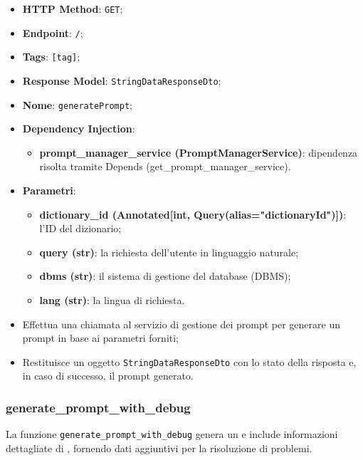 \begin{itemize}
  \item \textbf{HTTP Method}: \texttt{GET};
  \item \textbf{Endpoint}: \texttt{/};
  \item \textbf{Tags}: \texttt{[tag]};
  \item \textbf{Response Model}: \texttt{StringDataResponseDto};
  \item \textbf{Nome}: \texttt{generatePrompt};
  \item \textbf{Dependency Injection}:
  \begin{itemize}
    \item \textbf{prompt\_manager\_service (PromptManagerService)}: dipendenza risolta tramite Depends (get\_prompt\_manager\_service).
  \end{itemize}
  \item \textbf{Parametri}:
  \begin{itemize}
    \item \textbf{dictionary\_id (Annotated[int, Query(alias="dictionaryId")])}: l'ID del dizionario;
    \item \textbf{query (str)}: la richiesta dell'utente in linguaggio naturale;
    \item \textbf{dbms (str)}: il sistema di gestione del database (DBMS);
    \item \textbf{lang (str)}: la lingua di richiesta.
  \end{itemize}
\end{itemize}

\begin{itemize}
  \item Effettua una chiamata al servizio di gestione dei prompt per generare un prompt in base ai parametri forniti;
  \item Restituisce un oggetto \texttt{StringDataResponseDto} con lo stato della risposta e, in caso di successo, il prompt generato.
\end{itemize}

\subsubsection{generate\_prompt\_with\_debug}

\par La funzione \texttt{generate\_prompt\_with\_debug} genera un  e include informazioni dettagliate di , fornendo dati aggiuntivi per la risoluzione di problemi.

